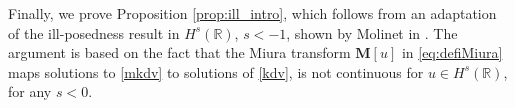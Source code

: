 \documentclass[%
11pt,  reqno]{amsart}
\newcommand{\5}{\textup{V}}
\theoremstyle{remark}
\newcommand{\R}{\mathbb{R}}
\newcommand{\MMb}{\mathbf{M}}
\newcommand{\Gc}{\mathcal{G}}
\numberwithin{equation}{section}
\numberwithin{theorem}{section}
\begin{document}


Finally, we prove Proposition \ref{prop:ill_intro}, which follows from an adaptation of the ill-posedness result in $H^s(\R)$, $s<-1$, shown by Molinet in \cite{Molinet_ill_line}. The argument is based on the fact that the Miura transform $\MMb[u]$ in \eqref{eq:defiMiura} 
maps solutions to \eqref{mkdv} to solutions of \ref{kdv},
is not continuous for $u\in H^s(\R)$, for any $s<0$.
\end{document}
